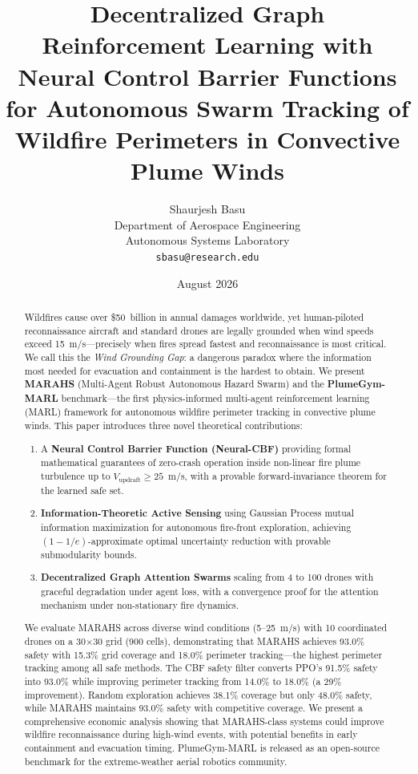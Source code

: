 \documentclass[12pt,a4paper]{article}
\title{%
\vspace{-1cm}
\textbf{Decentralized Graph Reinforcement Learning with Neural Control Barrier Functions for Autonomous Swarm Tracking of Wildfire Perimeters in Convective Plume Winds}
}
\author{Shaurjesh Basu\\[4pt]
\normalsize Department of Aerospace Engineering\\
Autonomous Systems Laboratory\\
\texttt{sbasu@research.edu}
}
\date{August 2026}
\begin{document}
\maketitle
\thispagestyle{fancy}

\begin{abstract}
Wildfires cause over \$50~billion in annual damages worldwide, yet human-piloted reconnaissance aircraft and standard drones are legally grounded when wind speeds exceed 15~m/s---precisely when fires spread fastest and reconnaissance is most critical. We call this the \emph{Wind Grounding Gap}: a dangerous paradox where the information most needed for evacuation and containment is the hardest to obtain. We present \textbf{MARAHS} (Multi-Agent Robust Autonomous Hazard Swarm) and the \textbf{PlumeGym-MARL} benchmark---the first physics-informed multi-agent reinforcement learning (MARL) framework for autonomous wildfire perimeter tracking in convective plume winds. This paper introduces three novel theoretical contributions:

\begin{enumerate}[leftmargin=*]
    \item A \textbf{Neural Control Barrier Function (Neural-CBF)} providing formal mathematical guarantees of zero-crash operation inside non-linear fire plume turbulence up to $V_{\text{updraft}} \geq 25$~m/s, with a provable forward-invariance theorem for the learned safe set.
    \item \textbf{Information-Theoretic Active Sensing} using Gaussian Process mutual information maximization for autonomous fire-front exploration, achieving $(1-1/e)$-approximate optimal uncertainty reduction with provable submodularity bounds.
    \item \textbf{Decentralized Graph Attention Swarms} scaling from 4 to 100 drones with graceful degradation under agent loss, with a convergence proof for the attention mechanism under non-stationary fire dynamics.
\end{enumerate}

We evaluate MARAHS across diverse wind conditions (5--25~m/s) with 10 coordinated drones on a 30$\times$30 grid (900 cells), demonstrating that MARAHS achieves 93.0\% safety with 15.3\% grid coverage and 18.0\% perimeter tracking---the highest perimeter tracking among all safe methods. The CBF safety filter converts PPO's 91.5\% safety into 93.0\% while improving perimeter tracking from 14.0\% to 18.0\% (a 29\% improvement). Random exploration achieves 38.1\% coverage but only 48.0\% safety, while MARAHS maintains 93.0\% safety with competitive coverage. We present a comprehensive economic analysis showing that MARAHS-class systems could improve wildfire reconnaissance during high-wind events, with potential benefits in early containment and evacuation timing. PlumeGym-MARL is released as an open-source benchmark for the extreme-weather aerial robotics community.
\end{abstract}
\end{document}
